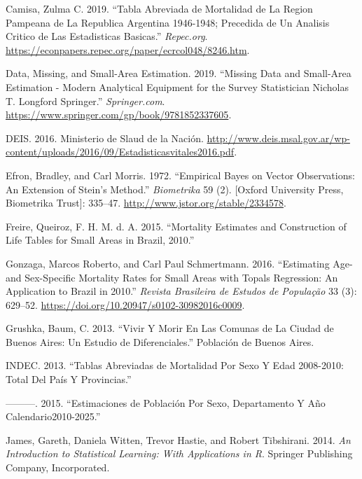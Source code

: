 \documentclass[12pt,]{article}
\begin{document}
\leavevmode\hypertarget{ref-Camisa_2019}{}%
Camisa, Zulma C. 2019. ``Tabla Abreviada de Mortalidad de La Region
Pampeana de La Republica Argentina 1946-1948; Precedida de Un Analisis
Critico de Las Estadisticas Basicas.'' \emph{Repec.org}.
\url{https://econpapers.repec.org/paper/ecrcol048/8246.htm}.

\leavevmode\hypertarget{ref-Longford2005}{}%
Data, Missing, and Small-Area Estimation. 2019. ``Missing Data and
Small-Area Estimation - Modern Analytical Equipment for the Survey
Statistician \textbar{} Nicholas T. Longford \textbar{} Springer.''
\emph{Springer.com}.
\url{https://www.springer.com/gp/book/9781852337605}.

\leavevmode\hypertarget{ref-DEIS2016}{}%
DEIS. 2016. Ministerio de Slaud de la Nación.
\url{http://www.deis.msal.gov.ar/wp-content/uploads/2016/09/Estadisticasvitales2016.pdf}.

\leavevmode\hypertarget{ref-Efron1972}{}%
Efron, Bradley, and Carl Morris. 1972. ``Empirical Bayes on Vector
Observations: An Extension of Stein's Method.'' \emph{Biometrika} 59
(2). {[}Oxford University Press, Biometrika Trust{]}: 335--47.
\url{http://www.jstor.org/stable/2334578}.

\leavevmode\hypertarget{ref-FreireEtAl2015}{}%
Freire, Queiroz, F. H. M. d. A. 2015. ``Mortality Estimates and
Construction of Life Tables for Small Areas in Brazil, 2010.''

\leavevmode\hypertarget{ref-Gonzaga_Schmertmann_2016}{}%
Gonzaga, Marcos Roberto, and Carl Paul Schmertmann. 2016. ``Estimating
Age- and Sex-Specific Mortality Rates for Small Areas with Topals
Regression: An Application to Brazil in 2010.'' \emph{Revista Brasileira
de Estudos de População} 33 (3): 629--52.
\url{https://doi.org/10.20947/s0102-30982016c0009}.

\leavevmode\hypertarget{ref-Grushka2013}{}%
Grushka, Baum, C. 2013. ``Vivir Y Morir En Las Comunas de La Ciudad de
Buenos Aires: Un Estudio de Diferenciales.'' Población de Buenos Aires.

\leavevmode\hypertarget{ref-INDEC2013}{}%
INDEC. 2013. ``Tablas Abreviadas de Mortalidad Por Sexo Y Edad
2008-2010: Total Del País Y Provincias.''

\leavevmode\hypertarget{ref-INDEC2015}{}%
---------. 2015. ``Estimaciones de Población Por Sexo, Departamento Y
Año Calendario2010-2025.''

\leavevmode\hypertarget{ref-James2014}{}%
James, Gareth, Daniela Witten, Trevor Hastie, and Robert Tibshirani.
2014. \emph{An Introduction to Statistical Learning: With Applications
in R}. Springer Publishing Company, Incorporated.
\end{document}
